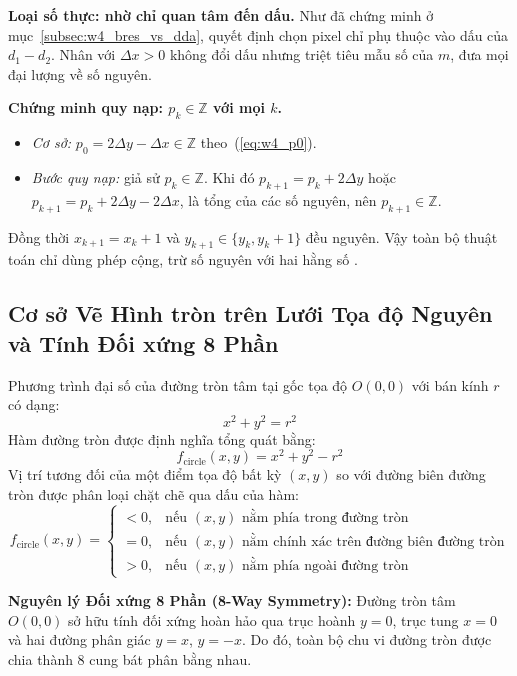 \textbf{Loại số thực: nhờ chỉ quan tâm đến dấu.} Như đã chứng minh ở mục~\ref{subsec:w4_bres_vs_dda}, quyết định chọn pixel chỉ phụ thuộc vào dấu của $d_1 - d_2$. Nhân với $\Delta x > 0$ không đổi dấu nhưng triệt tiêu mẫu số của $m$, đưa mọi đại lượng về số nguyên.

\textbf{Chứng minh quy nạp: $p_k \in \mathbb{Z}$ với mọi $k$.}
\begin{itemize}
    \item \textit{Cơ sở:} $p_0 = 2\Delta y - \Delta x \in \mathbb{Z}$ theo~(\ref{eq:w4_p0}).
    \item \textit{Bước quy nạp:} giả sử $p_k \in \mathbb{Z}$. Khi đó $p_{k+1} = p_k + 2\Delta y$ hoặc $p_{k+1} = p_k + 2\Delta y - 2\Delta x$, là tổng của các số nguyên, nên $p_{k+1} \in \mathbb{Z}$.
\end{itemize}
Đồng thời $x_{k+1} = x_k + 1$ và $y_{k+1} \in \{y_k, y_k + 1\}$ đều nguyên. Vậy toàn bộ thuật toán chỉ dùng phép cộng, trừ số nguyên với hai hằng số \citep[slide~10]{dhmt_lec3}.

\subsection{Cơ sở Vẽ Hình tròn trên Lưới Tọa độ Nguyên và Tính Đối xứng 8 Phần}
\label{subsec:w4_circle_sym}

Phương trình đại số của đường tròn tâm tại gốc tọa độ $O(0, 0)$ với bán kính $r$ có dạng:
\begin{equation}
x^2 + y^2 = r^2
\end{equation}
Hàm đường tròn được định nghĩa tổng quát bằng:
\begin{equation}
f_{\text{circle}}(x, y) = x^2 + y^2 - r^2
\end{equation}
Vị trí tương đối của một điểm tọa độ bất kỳ $(x, y)$ so với đường biên đường tròn được phân loại chặt chẽ qua dấu của hàm:
\begin{equation}
f_{\text{circle}}(x, y) = \begin{cases}
< 0, & \text{nếu } (x, y) \text{ nằm phía trong đường tròn} \\
= 0, & \text{nếu } (x, y) \text{ nằm chính xác trên đường biên đường tròn} \\
> 0, & \text{nếu } (x, y) \text{ nằm phía ngoài đường tròn}
\end{cases}
\end{equation}

\textbf{Nguyên lý Đối xứng 8 Phần (8-Way Symmetry):}
Đường tròn tâm $O(0, 0)$ sở hữu tính đối xứng hoàn hảo qua trục hoành $y = 0$, trục tung $x = 0$ và hai đường phân giác $y = x$, $y = -x$. Do đó, toàn bộ chu vi đường tròn được chia thành 8 cung bát phân bằng nhau. 

